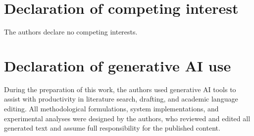 \documentclass[preprint,10pt]{elsarticle}
\begin{document}
\section*{Declaration of competing interest}
The authors declare no competing interests.

\section*{Declaration of generative AI use}
During the preparation of this work, the authors used generative AI tools to assist with productivity in literature search, drafting, and academic language editing. All methodological formulations, system implementations, and experimental analyses were designed by the authors, who reviewed and edited all generated text and assume full responsibility for the published content.
\end{document}
